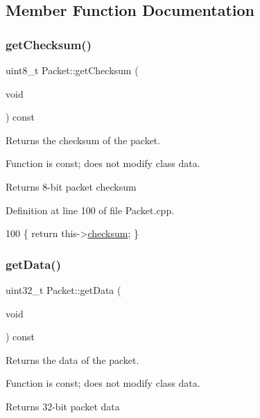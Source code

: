 \subsection{Member Function Documentation}
\mbox{\label{class_packet_aa529856197fdd79e6ca8cc86966cec10}} 
\subsubsection{\texorpdfstring{get\+Checksum()}{getChecksum()}}
{\footnotesize\ttfamily uint8\+\_\+t Packet\+::get\+Checksum (\begin{DoxyParamCaption}\item[{void}]{ }\end{DoxyParamCaption}) const}



Returns the checksum of the packet. 

Function is const; does not modify class data. \begin{DoxyReturn}{Returns}
8-\/bit packet checksum 
\end{DoxyReturn}


Definition at line 100 of file Packet.\+cpp.


\begin{DoxyCode}
100 \{ \textcolor{keywordflow}{return} this->\hyperlink{class_packet_a900989fb6f663e8c66faeadb3dc7a318}{checksum}; \}
\end{DoxyCode}
\mbox{\label{class_packet_a510ff2d5d2d28f275c26a90a7ae311d1}} 
\subsubsection{\texorpdfstring{get\+Data()}{getData()}}
{\footnotesize\ttfamily uint32\+\_\+t Packet\+::get\+Data (\begin{DoxyParamCaption}\item[{void}]{ }\end{DoxyParamCaption}) const}



Returns the data of the packet. 

Function is const; does not modify class data. \begin{DoxyReturn}{Returns}
32-\/bit packet data 
\end{DoxyReturn}


